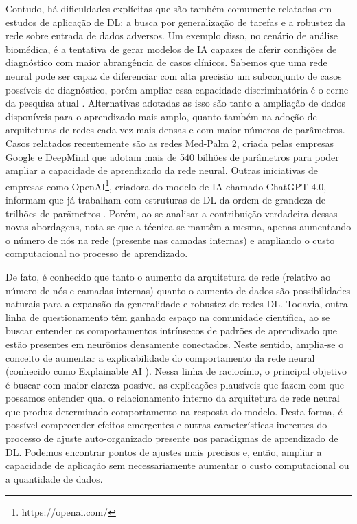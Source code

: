 \documentclass[
	12pt,				%
	openany,oneside,
	a4paper,			%
	english,			%
	brazil,				%
	]{abntex2}
\begin{document}
Contudo, há dificuldades explícitas que são também comumente relatadas em estudos de aplicação de DL: a busca por generalização de tarefas e a robustez da rede sobre entrada de dados adversos. Um exemplo disso, no cenário de análise biomédica, é a tentativa de gerar modelos de IA capazes de aferir condições de diagnóstico com maior abrangência de casos clínicos. Sabemos que uma rede neural pode ser capaz de diferenciar com alta precisão um subconjunto de casos possíveis de diagnóstico, porém ampliar essa capacidade discriminatória é o cerne da pesquisa atual \cite{Sapoval2022}. Alternativas adotadas as isso são tanto a ampliação de dados disponíveis para o aprendizado mais amplo, quanto também na adoção de arquiteturas de redes cada vez mais densas e com maior números de parâmetros. Casos relatados recentemente são as redes Med-Palm 2, criada pelas empresas Google e DeepMind \cite{Matias2023} que adotam mais de 540 bilhões de parâmetros para poder ampliar a capacidade de aprendizado da rede neural. Outras iniciativas de empresas como OpenAI\footnote{https://openai.com/}, criadora do modelo de IA chamado ChatGPT 4.0, informam que já trabalham com estruturas de DL da ordem de grandeza de trilhões de parãmetros \cite{OpenAI2023}. Porém, ao se analisar a contribuição verdadeira dessas novas abordagens, nota-se que a técnica se mantêm a mesma, apenas aumentando o número de nós na rede (presente nas camadas internas) e ampliando o custo computacional no processo de aprendizado.

De fato, é conhecido que tanto o aumento da arquitetura de rede (relativo ao número de nós e camadas internas) quanto o aumento de dados são possibilidades naturais para a expansão da generalidade e robustez de redes DL. Todavia, outra linha de questionamento têm ganhado espaço na comunidade científica, ao se buscar entender os comportamentos intrínsecos de padrões de aprendizado que estão presentes em neurônios densamente conectados. Neste sentido, amplia-se o conceito de aumentar a explicabilidade do comportamento da rede neural (conhecido como Explainable AI \cite{Keppeler2023}). Nessa linha de raciocínio, o principal objetivo é buscar com maior clareza possível as explicações plausíveis que fazem com que possamos entender qual o relacionamento interno da arquitetura de rede neural que produz determinado comportamento na resposta do modelo. Desta forma, é possível compreender efeitos emergentes e outras características inerentes do processo de ajuste auto-organizado presente nos paradigmas de aprendizado de DL. Podemos encontrar pontos de ajustes mais precisos e, então, ampliar a capacidade de aplicação sem necessariamente aumentar o custo computacional ou a quantidade de dados.
\end{document}
